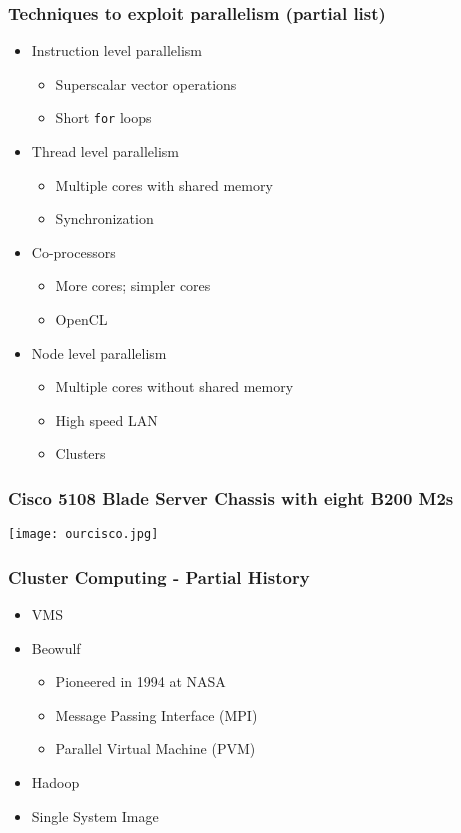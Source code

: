 \documentclass{beamer}
\begin{document}
\begin{frame}
\frametitle{Techniques to exploit parallelism (partial list)}
\begin{itemize}
\item Instruction level parallelism
\begin{itemize}
\item Superscalar vector operations
\item \alert{Short {\tt for} loops}
\end{itemize}
\item Thread level parallelism
\begin{itemize}
\item Multiple cores with shared memory
\item \alert{Synchronization}
\end{itemize}
\item Co-processors
\begin{itemize}
\item More cores; simpler cores
\item \alert{OpenCL}
\end{itemize}
\item Node level parallelism
\begin{itemize}
\item Multiple cores without shared memory
\item High speed LAN
\item Clusters
\end{itemize}
\end{itemize}
\end{frame}

\begin{frame}
\frametitle{Cisco 5108 Blade Server Chassis with eight B200 M2s}
\texttt{[image: ourcisco.jpg]}
\end{frame}

\begin{frame}
\frametitle{Cluster Computing - Partial History}
\begin{itemize}
\item VMS
\item Beowulf
\begin{itemize}
\item Pioneered in 1994 at NASA
\item Message Passing Interface (MPI)
\item Parallel Virtual Machine (PVM)
\end{itemize}
\item Hadoop
\item Single System Image
\end{itemize}
\end{frame}
\end{document}
